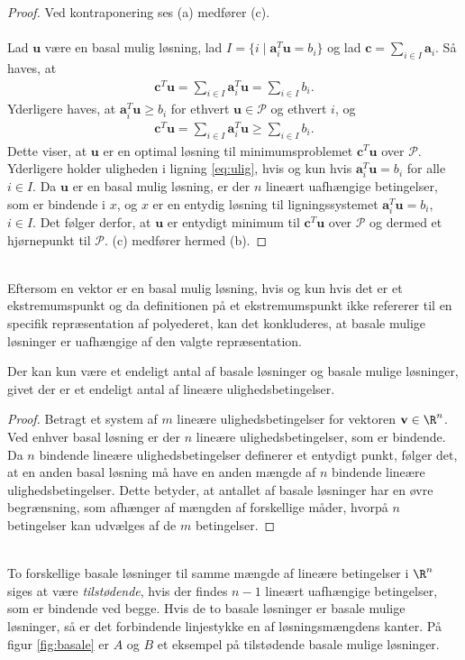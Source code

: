 \begin{proof}
Ved kontraponering ses (a) medfører (c).
\\\\
%
Lad $\textbf{u}$ være en basal mulig løsning, lad $I = \{i \mid \textbf{a}_i^T\textbf{u} = b_i \}$ og lad $\textbf{c}=\sum_{i \in I} \textbf{a}_i$.
Så haves, at
%
\begin{align*}
\textbf{c}^T\textbf{u} = \sum_{i\in I}\textbf{a}_i^T\textbf{u} = \sum_{i\in I}b_i.
\end{align*}
%
Yderligere haves, at $\textbf{a}_i^T\textbf{u} \geq b_i$ for ethvert $\textbf{u} \in \mathcal{P}$ og ethvert $i$, og 
%
\begin{align}\label{eq:ulig}
\textbf{c}^T\textbf{u} = \sum_{i\in I}\textbf{a}_i^T\textbf{u} \geq \sum_{i\in I}b_i.
\end{align}
%
Dette viser, at $\textbf{u}$ er en optimal løsning til minimumsproblemet $\textbf{c}^T\textbf{u}$ over $\mathcal{P}$.
Yderligere holder uligheden i ligning \ref{eq:ulig}, hvis og kun hvis $\textbf{a}_i^T\textbf{u} = b_i$ for alle $i \in I$.
Da $\textbf{u}$ er en basal mulig løsning, er der $n$ lineært uafhængige betingelser, som er bindende i $x$, og $x$ er en entydig løsning til ligningssystemet $\textbf{a}_i^T\textbf{u} = b_i$, $i \in I$.
Det følger derfor, at $\textbf{u}$ er entydigt minimum til $\textbf{c}^T\textbf{u}$ over $\mathcal{P}$ og dermed et hjørnepunkt til $\mathcal{P}$.
(c) medfører hermed (b).
%
\end{proof}\\
%
Eftersom en vektor er en basal mulig løsning, hvis og kun hvis det er et ekstremumspunkt og da definitionen på et ekstremumspunkt ikke refererer til en specifik repræsentation af polyederet, kan det konkluderes, at basale mulige løsninger er uafhængige af den valgte repræsentation.
%
\begin{kor}{}{}
Der kan kun være et endeligt antal af basale løsninger og basale mulige løsninger, givet der er et endeligt antal af lineære ulighedsbetingelser.
\end{kor}
%
\begin{proof}
Betragt et system af $m$ lineære ulighedsbetingelser for vektoren $\textbf{v} \in \R^n$.
Ved enhver basal løsning er der $n$ lineære ulighedsbetingelser, som er bindende.
Da $n$ bindende lineære ulighedsbetingelser definerer et entydigt punkt, følger det, at en anden basal løsning må have en anden mængde af $n$ bindende lineære ulighedsbetingelser.
Dette betyder, at antallet af basale løsninger har en øvre begrænsning, som afhænger af mængden af forskellige måder, hvorpå $n$ betingelser kan udvælges af de $m$ betingelser.
\end{proof}\\
%
To forskellige basale løsninger til samme mængde af lineære betingelser i $\R^n$ siges at være \textit{tilstødende}, hvis der findes $n-1$ lineært uafhængige betingelser, som er bindende ved begge. 
Hvis de to basale løsninger er basale mulige løsninger, så er det forbindende linjestykke en af løsningsmængdens kanter.
På figur \ref{fig:basale} er $A$ og $B$ et eksempel på tilstødende basale mulige løsninger.